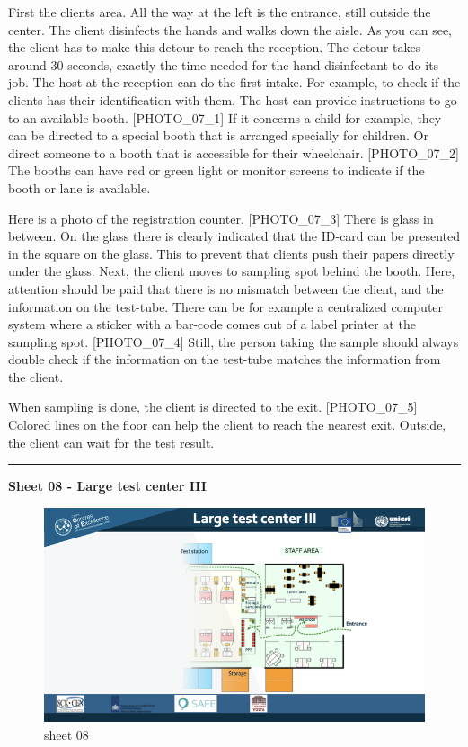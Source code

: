 \documentclass[
]{book}
\begin{document}
First the clients area. All the way at the left is the entrance, still
outside the center. The client disinfects the hands and walks down the
aisle. As you can see, the client has to make this detour to reach the
reception. The detour takes around 30 seconds, exactly the time needed
for the hand-disinfectant to do its job. The host at the reception can
do the first intake. For example, to check if the clients has their
identification with them. The host can provide instructions to go to an
available booth. {[}PHOTO\_07\_1{]} If it concerns a child for example, they
can be directed to a special booth that is arranged specially for
children. Or direct someone to a booth that is accessible for their
wheelchair. {[}PHOTO\_07\_2{]} The booths can have red or green light or
monitor screens to indicate if the booth or lane is available.

Here is a photo of the registration counter. {[}PHOTO\_07\_3{]} There is
glass in between. On the glass there is clearly indicated that the
ID-card can be presented in the square on the glass. This to prevent
that clients push their papers directly under the glass. Next, the
client moves to sampling spot behind the booth. Here, attention should
be paid that there is no mismatch between the client, and the
information on the test-tube. There can be for example a centralized
computer system where a sticker with a bar-code comes out of a label
printer at the sampling spot. {[}PHOTO\_07\_4{]} Still, the person taking
the sample should always double check if the information on the
test-tube matches the information from the client.

When sampling is done, the client is directed to the exit.
{[}PHOTO\_07\_5{]} Colored lines on the floor can help the client to reach
the nearest exit. Outside, the client can wait for the test result.

\begin{center}\rule{0.5\linewidth}{0.5pt}\end{center}

\textbf{Sheet 08 - Large test center III}

\begin{figure}
\centering
\includegraphics{images/m05/m05_Workflow_final.008.jpeg}
\caption{sheet 08}
\end{figure}
\end{document}
